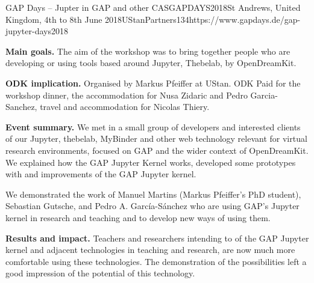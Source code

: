 \begin{event}{GAP Days -- Jupter in GAP and other CAS}{GAPDAYS2018}{St Andrews, United Kingdom, 4th to 8th June 2018}{UStanPartners}{13}{4}{https://www.gapdays.de/gap-jupyter-days2018}

\textbf{Main goals.} The aim of the workshop was to bring together people who are developing or using tools based around Jupyter, Thebelab, by OpenDreamKit.

\textbf{ODK implication.} Organised by Markus Pfeiffer at UStan. ODK Paid for
the workshop dinner, the accommodation for Nusa Zidaric and Pedro
Garcia-Sanchez, travel and accommodation for Nicolas Thiery.

\textbf{Event summary.} We met in a small group of developers and interested
clients of our Jupyter, thebelab, MyBinder and other web technology relevant for
virtual research environments, focused on GAP and the wider context of
OpenDreamKit. We explained how the GAP Jupyter Kernel works, developed some
prototypes with and improvements of the GAP Jupyter kernel.

We demonstrated the work of Manuel Martins (Markus Pfeiffer's PhD student),
Sebastian Gutsche, and Pedro A. García-Sánchez who are using GAP's Jupyter
kernel in research and teaching and to develop new ways of using them.

\textbf{Results and impact.} Teachers and researchers intending to of the GAP
Jupyter kernel and adjacent technologies in teaching and research, are now much
more comfortable using these technologies. The demonstration of the
possibilities left a good impression of the potential of this technology.

\end{event}
